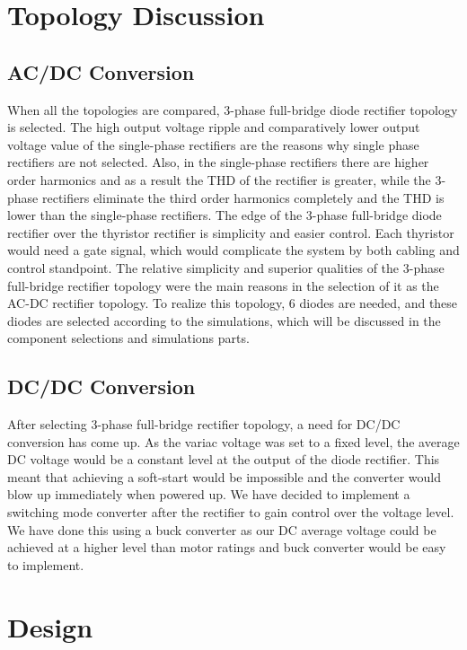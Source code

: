 \documentclass[12pt]{article}
\begin{document}
\section{\Large Topology Discussion}
\subsection{AC/DC Conversion}
When all the topologies are compared, 3-phase full-bridge diode rectifier topology is selected. The high output voltage ripple and comparatively lower output voltage value of the single-phase rectifiers are the reasons why single phase rectifiers are not selected. Also, in the single-phase rectifiers there are higher order harmonics and as a result the THD of the rectifier is greater, while the 3-phase rectifiers eliminate the third order harmonics completely and the THD is lower than the single-phase rectifiers.  The edge of the 3-phase full-bridge diode rectifier over the thyristor rectifier is simplicity and easier control. Each thyristor would need a gate signal, which would complicate the system by both cabling and control standpoint. The relative simplicity and superior qualities of the 3-phase full-bridge rectifier topology were the main reasons in the selection of it as the AC-DC rectifier topology. To realize this topology, 6 diodes are needed, and these diodes are selected according to the simulations, which will be discussed in the component selections and simulations parts.
\subsection{DC/DC Conversion}
After selecting 3-phase full-bridge rectifier topology, a need for DC/DC conversion has come up. As the variac voltage was set to a fixed level, the average DC voltage would be a constant level at the output of the diode rectifier. This meant that achieving a soft-start would be impossible and the converter would blow up immediately when powered up. We have decided to implement a switching mode converter after the rectifier to gain control over the voltage level. We have done this using a buck converter as our DC average voltage could be achieved at a higher level than motor ratings and buck converter would be easy to implement.
\section{\Large Design}
\end{document}
